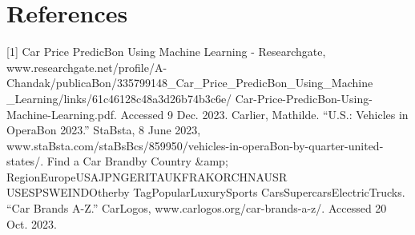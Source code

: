 \documentclass{article}
\begin{document}
\section{References}
[1] Car Price PredicBon Using Machine Learning - Researchgate, www.researchgate.net/profile/A-Chandak/publicaBon/335799148\_Car\_Price\_PredicBon\_Using\_Machine\newline
\_Learning/links/61c46128c48a3d26b74b3c6e/
Car-Price-PredicBon-Using-Machine-Learning.pdf. Accessed 9 Dec. 2023.
\newline
\newline
[2] Carlier, Mathilde. “U.S.: Vehicles in OperaBon
2023.” StaBsta, 8 June 2023, www.staBsta.com/staBsBcs/859950/vehicles-in-operaBon-by-quarter-united-states/.
\newline
\newline
[3] Find a Car Brandby Country \&amp;
RegionEuropeUSAJPNGERITAUKFRAKORCHNAUSR
USESPSWEINDOtherby TagPopularLuxurySports
CarsSupercarsElectricTrucks. “Car Brands A-Z.”
CarLogos, www.carlogos.org/car-brands-a-z/.
Accessed 20 Oct. 2023.
\end{document}
